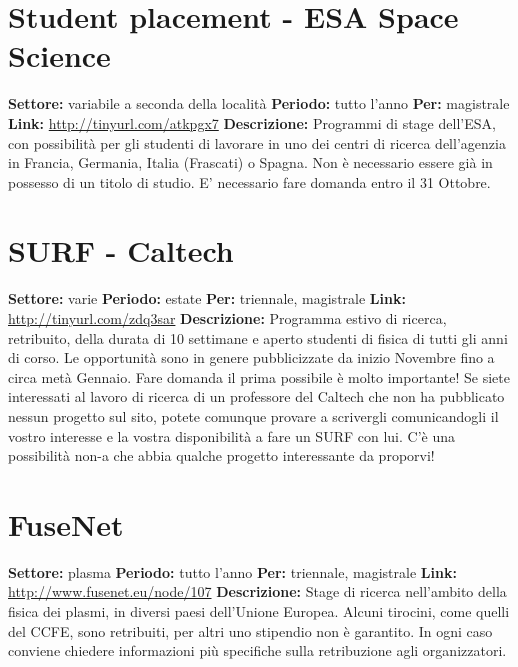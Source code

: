 \documentclass[a4paper,10pt]{article}
\begin{document}
\section{Student placement - ESA  Space Science}  
\textbf{Settore:} variabile a seconda della località\newline
\textbf{Periodo:} tutto l'anno\newline
\textbf{Per:} magistrale\newline
\textbf{Link:} \url{http://tinyurl.com/atkpgx7} \newline
\textbf{Descrizione:} Programmi di stage dell’ESA, con possibilità per gli studenti di lavorare in uno dei centri di ricerca dell’agenzia in Francia, Germania, Italia (Frascati) o Spagna. Non è necessario essere già in possesso di un titolo di studio. E’ necessario fare domanda entro il 31 Ottobre. 

\section{SURF - Caltech}
\textbf{Settore:} varie\newline
\textbf{Periodo:} estate\newline
\textbf{Per:} triennale, magistrale\newline
\textbf{Link:} \url{http://tinyurl.com/zdq3sar} \newline
\textbf{Descrizione:} Programma estivo di ricerca, retribuito, della durata di 10 settimane e aperto studenti di fisica di tutti gli anni di corso. Le opportunità sono in genere pubblicizzate da inizio Novembre fino a circa metà Gennaio. Fare domanda il prima possibile è molto importante! Se siete interessati al lavoro di ricerca di un professore del Caltech che non ha pubblicato nessun progetto sul sito, potete comunque provare a scrivergli comunicandogli il vostro interesse e la vostra disponibilità a fare un SURF con lui. C’è una possibilità non-a che abbia qualche progetto interessante da proporvi! 

\section{FuseNet}
\textbf{Settore:} plasma\newline
\textbf{Periodo:} tutto l'anno\newline
\textbf{Per:} triennale, magistrale\newline
\textbf{Link:} \url{http://www.fusenet.eu/node/107} \newline
\textbf{Descrizione:} Stage di ricerca nell’ambito della fisica dei plasmi, in diversi paesi dell’Unione Europea. Alcuni tirocini, come quelli del CCFE, sono retribuiti, per altri uno stipendio non è garantito. In ogni caso conviene chiedere informazioni più specifiche sulla retribuzione agli organizzatori.  
\end{document}
